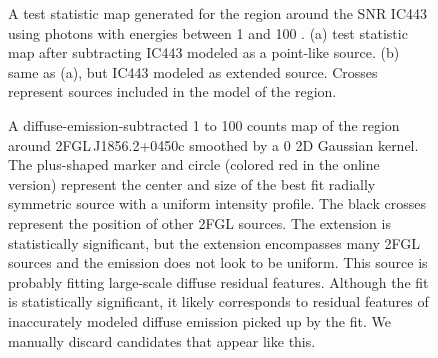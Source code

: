 \documentclass[12pt,preprint]{aastex}
\newif\ifcolorfigure
\newcommand{\gev}{\text{GeV}\xspace}
\begin{document}
\begin{figure}
  \ifcolorfigure
    \plotone{ic443_plots/res_tsmap_ic443_color.eps}
    \else
    \fi

  \caption{
  A test statistic map generated for the region around the SNR 
  IC443 using 
  photons with energies between
  1 \gev and 100 \gev.  (a) test statistic map after
  subtracting IC443 modeled as a point-like source. (b) same as (a), but
  IC443 modeled as extended source. Crosses represent sources included
  in the model of the region.}
  \label{res_tsmaps}
\end{figure}

\clearpage
\begin{figure}
    \ifcolorfigure
    \plotone{source_plots/example_bad_fit_color.eps}
    \else
    \fi
    \caption{
    A diffuse-emission-subtracted 1 \gev to 100 \gev counts map of the
    region around 2FGL\,J1856.2+0450c smoothed by a 0 2D Gaussian
    kernel. The plus-shaped marker and circle (colored red in
    the online version) represent the center and size of the best fit
    radially symmetric source with a uniform intensity profile.  The black
    crosses represent the position of other 2FGL sources.  The extension
    is statistically significant, but the extension encompasses many 2FGL
    sources and the emission does not look to be uniform. This source
    is probably fitting large-scale diffuse residual features. Although
    the fit is statistically significant, it likely corresponds to
    residual features of inaccurately modeled diffuse emission picked
    up by the fit.  We manually discard candidates that appear like this.
    }
    \label{example_bad_fit}
\end{figure}
\end{document}
